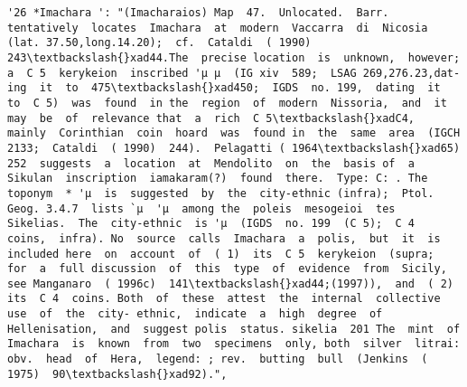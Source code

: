 \documentclass[11pt]{article}
\begin{document}
\begin{Verbatim}[commandchars=\\\{\}]
         '26 *Imachara ': "(Imacharaios) Map  47.  Unlocated.  Barr. tentatively  locates  Imachara  at  modern  Vaccarra  di  Nicosia (lat. 37.50,long.14.20);  cf.  Cataldi  ( 1990)  243\textbackslash{}xad44.The  precise location  is  unknown,  however;  a  C 5  kerykeion  inscribed 'µ µ  (IG xiv  589;  LSAG 269,276.23,dat- ing  it  to  475\textbackslash{}xad450;  IGDS  no. 199,  dating  it  to  C 5)  was  found  in the  region  of  modern  Nissoria,  and  it  may  be  of  relevance that  a  rich  C 5\textbackslash{}xadC4,  mainly  Corinthian  coin  hoard  was  found in  the  same  area  (IGCH 2133;  Cataldi  ( 1990)  244).  Pelagatti ( 1964\textbackslash{}xad65)  252  suggests  a  location  at  Mendolito  on  the  basis of  a  Sikulan  inscription  iamakaram(?)  found  there.  Type: C: . The  toponym  * 'µ  is  suggested  by  the  city-ethnic (infra);  Ptol.  Geog. 3.4.7  lists `µ  'µ  among the  poleis  mesogeioi  tes  Sikelias.  The  city-ethnic  is 'µ  (IGDS  no. 199  (C 5);  C 4  coins,  infra). No  source  calls  Imachara  a  polis,  but  it  is  included here  on  account  of  ( 1)  its  C 5  kerykeion  (supra;  for  a  full discussion  of  this  type  of  evidence  from  Sicily,  see Manganaro  ( 1996c)  141\textbackslash{}xad44;(1997)),  and  ( 2)  its  C 4  coins. Both  of  these  attest  the  internal  collective  use  of  the  city- ethnic,  indicate  a  high  degree  of  Hellenisation,  and  suggest polis  status. sikelia  201 The  mint  of  Imachara  is  known  from  two  specimens  only, both  silver  litrai:  obv.  head  of  Hera,  legend: ; rev.  butting  bull  (Jenkins  ( 1975)  90\textbackslash{}xad92).",

\end{Verbatim}
\end{document}
